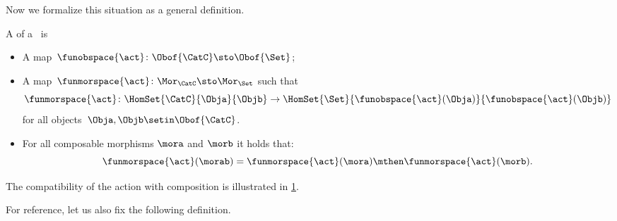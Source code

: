 Now we formalize this situation as a general definition.

\begin{ctdefinition}
    \label{def:semicategory-action}
    A  of a ~\CatC is

    \constit
    \begin{itemize}
        \item A map~$\funobspace{\act} \colon \Obof{\CatC} \sto \Obof{\Set}$;
        \item A map~$\funmorspace{\act} \colon \Mor_\CatC \sto \Mor_\Set$ such that
              \begin{equation}
                  \funmorspace{\act} \colon  \HomSet{\CatC}{\Obja}{\Objb} \to \HomSet{\Set}{ \funobspace{\act}(\Obja)}{\funobspace{\act}(\Objb)}
              \end{equation}
              for all objects~$\Obja, \Objb \setin \Obof{\CatC}$.
    \end{itemize}

    \condit

    \begin{itemize}
        \item For all composable morphisms $\mora$ and $\morb$ it holds that:
              \begin{equation}
                  \funmorspace{\act}(\morab) = \funmorspace{\act}(\mora) \mthen \funmorspace{\act}(\morb).
              \end{equation}
    \end{itemize}
\end{ctdefinition}

The compatibility of the action with composition is illustrated in \cref{fig:semicat_ac_comm}.

\begin{figure}[h!]
    \centering
    \caption{}
    \label{fig:semicat_ac_comm}
\end{figure}

For reference, let us also fix the following definition.

